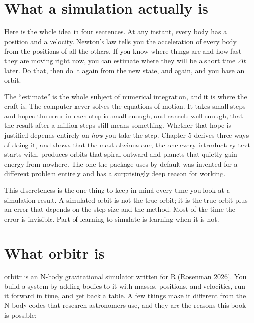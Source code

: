 \documentclass[
  10.5pt,
  letterpaper,
]{scrbook}
\theoremstyle{plain}
\theoremstyle{remark}
\begin{document}
\section{What a simulation actually
is}\label{what-a-simulation-actually-is}

Here is the whole idea in four sentences. At any instant, every body has
a position and a velocity. Newton's law tells you the acceleration of
every body from the positions of all the others. If you know where
things are and how fast they are moving right now, you can estimate
where they will be a short time \(\Delta t\) later. Do that, then do it
again from the new state, and again, and you have an orbit.

The ``estimate'' is the whole subject of numerical integration, and it
is where the craft is. The computer never solves the equations of
motion. It takes small steps and hopes the error in each step is small
enough, and cancels well enough, that the result after a million steps
still means something. Whether that hope is justified depends entirely
on \emph{how} you take the step. Chapter 5 derives three ways of doing
it, and shows that the most obvious one, the one every introductory text
starts with, produces orbits that spiral outward and planets that
quietly gain energy from nowhere. The one the package uses by default
was invented for a different problem entirely and has a surprisingly
deep reason for working.

This discreteness is the one thing to keep in mind every time you look
at a simulation result. A simulated orbit is not the true orbit; it is
the true orbit plus an error that depends on the step size and the
method. Most of the time the error is invisible. Part of learning to
simulate is learning when it is not.

\section{What orbitr is}\label{what-orbitr-is}

orbitr is an N-body gravitational simulator written for R (Rosenman
2026). You build a system by adding bodies to it with masses, positions,
and velocities, run it forward in time, and get back a table. A few
things make it different from the N-body codes that research astronomers
use, and they are the reasons this book is possible:
\end{document}

